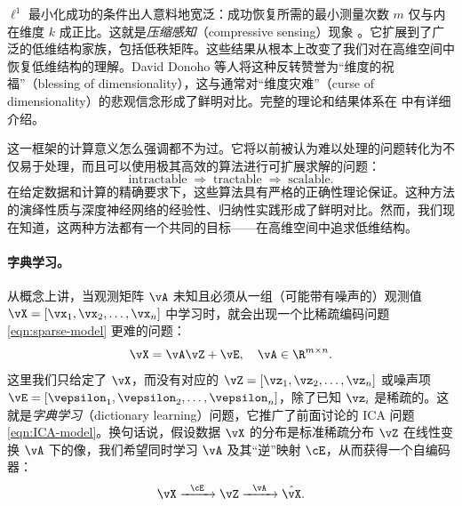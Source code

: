 \documentclass[../../book-main_zh.tex]{subfiles}
\begin{document}
\(\ell^{1}\) 最小化成功的条件出人意料地宽泛：成功恢复所需的最小测量次数 \(m\) 仅与内在维度 \(k\)
成正比。这就是\textit{压缩感知}（compressive sensing）现象
\cite{CandesE2006-ICM}。它扩展到了广泛的低维结构家族，包括低秩矩阵。这些结果从根本上改变了我们对在高维空间中恢复低维结构的理解。David
Donoho 等人将这种反转赞誉为“维度的祝福”（blessing of
dimensionality）\cite{DonohoD2000}，这与通常对“维度灾难”（curse of
dimensionality）的悲观信念形成了鲜明对比。完整的理论和结果体系在 \cite{Wright-Ma-2022} 中有详细介绍。

这一框架的计算意义怎么强调都不为过。它将以前被认为难以处理的问题转化为不仅易于处理，而且可以使用极其高效的算法进行可扩展求解的问题：
\begin{equation}
    \text{intractable} \;\Longrightarrow\; \text{tractable}
    \;\Longrightarrow\; \text{scalable}.
\end{equation}
在给定数据和计算的精确要求下，这些算法具有严格的正确性理论保证。这种方法的演绎性质与深度神经网络的经验性、归纳性实践形成了鲜明对比。然而，我们现在知道，这两种方法都有一个共同的目标——在高维空间中追求低维结构。

\paragraph{字典学习。}
从概念上讲，当观测矩阵 \(\vA\) 未知且必须从一组（可能带有噪声的）观测值 \(\vX = [\vx_{1}, \vx_{2},
\ldots, \vx_{n}]\) 中学习时，就会出现一个比稀疏编码问题 \eqref{eqn:sparse-model} 更难的问题：
\begin{equation}
    \vX = \vA \vZ + \vE, \quad \vA \in \R^{m\times n}.
    \label{eqn:dictionary-learning}
\end{equation}
这里我们只给定了 \(\vX\)，而没有对应的 \(\vZ = [\vz_{1}, \vz_{2}, \ldots, \vz_{n}]\)
或噪声项 \(\vE = [\vepsilon_{1}, \vepsilon_{2}, \ldots,
\vepsilon_{n}]\)，除了已知 \(\vz_{i}\) 是稀疏的。这就是\textit{字典学习}（dictionary
learning）问题，它推广了前面讨论的 ICA 问题 \eqref{eqn:ICA-model}。换句话说，假设数据 \(\vX\)
的分布是标准稀疏分布 \(\vZ\) 在线性变换 \(\vA\) 下的像，我们希望同时学习 \(\vA\) 及其“逆”映射
\(\cE\)，从而获得一个自编码器：
\begin{equation}
    \vX   \xrightarrow{\hspace{2mm} \cE\hspace{2mm}}  \vZ
    \xrightarrow{\hspace{2mm} \vA \hspace{2mm}} \hat{\vX}.
    \label{eqn:decoding-DL}
\end{equation}
\end{document}
